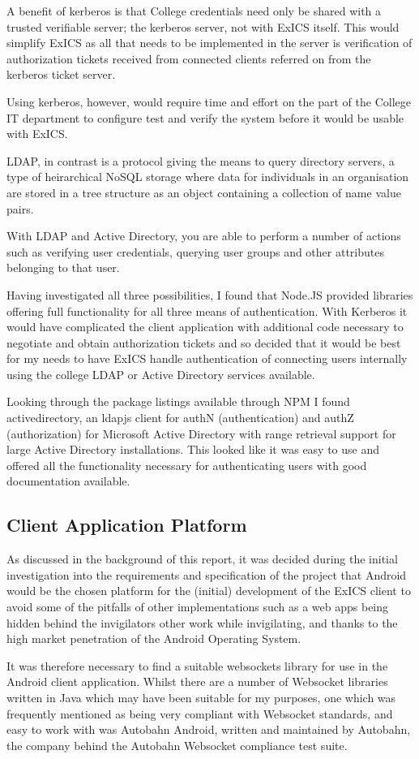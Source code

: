 A benefit of kerberos is that College credentials need only be shared with a trusted verifiable server; the kerberos server, not with ExICS itself.  This would simplify ExICS as all that needs to be implemented in the server is verification of authorization tickets received from connected clients referred on from the kerberos ticket server.

Using kerberos, however, would require time and effort on the part of the College IT department to configure test and verify the system before it would be usable with ExICS.

LDAP, in contrast is a protocol giving the means to query directory servers, a type of heirarchical NoSQL storage where data for individuals in an organisation are stored in a tree structure as an object containing a collection of name value pairs.

With LDAP and Active Directory, you are able to perform a number of actions such as verifying user credentials, querying user groups and other attributes belonging to that user.

Having investigated all three possibilities, I found that Node.JS provided libraries offering full functionality for all three means of authentication.  With Kerberos it would have complicated the client application with additional code necessary to negotiate and obtain authorization tickets and so decided that it would be best for my needs to have ExICS handle authentication of connecting users internally using the college LDAP or Active Directory services available.

Looking through the package listings available through NPM I found activedirectory, an ldapjs client for authN (authentication) and authZ (authorization) for Microsoft Active Directory with range retrieval support for large Active Directory installations.\cite{activedirectory}  This looked like it was easy to use and offered all the functionality necessary for authenticating users with good documentation available.

\subsection{Client Application Platform}

As discussed in the background of this report, it was decided during the initial investigation into the requirements and specification of the project that Android would be the chosen platform for the (initial) development of the ExICS client to avoid some of the pitfalls of other implementations such as a web apps being hidden behind the invigilators other work while invigilating, and thanks to the high market penetration of the Android Operating System.

It was therefore necessary to find a suitable websockets library for use in the Android client application.  Whilst there are a number of Websocket libraries written in Java which may have been suitable for my purposes, one which was frequently mentioned as being very compliant with Websocket standards, and easy to work with was Autobahn Android, written and maintained by Autobahn, the company behind the Autobahn Websocket compliance test suite.